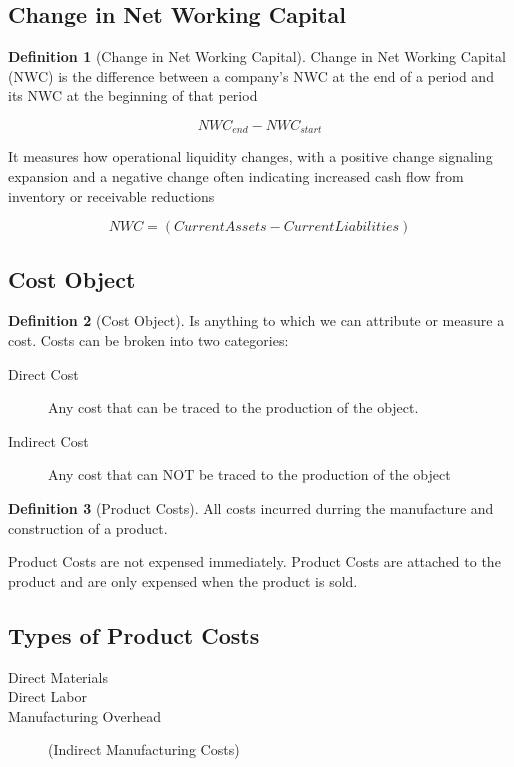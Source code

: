 \documentclass[12pt]{report}
\numberwithin{equation}{chapter}
\theoremstyle{definition}
\newtheorem{definition}{Definition}[chapter]
\theoremstyle{plain}
\theoremstyle{remark}
\begin{document}
\subsection{Change in Net Working Capital}
\begin{definition}[Change in Net Working Capital]
    Change in Net Working Capital (NWC) is the difference between a company's
    NWC at the end of a period and its NWC at the beginning of that period

    \[ NWC_{end} - NWC_{start} \]

    It measures how operational liquidity changes, with a positive change signaling
    expansion and a negative change often indicating increased cash flow from
    inventory or receivable reductions

    \[ NWC = (Current Assets - Current Liabilities) \]
\end{definition}

\subsection{Cost Object}
\begin{definition}[Cost Object]
    Is anything to which we can attribute or measure a cost. Costs can be broken into two categories:

    \begin{description}
        \item [Direct Cost] Any cost that can be traced to the production of the object.
        \item [Indirect Cost] Any cost that can NOT be traced to the production of the object
    \end{description}
\end{definition}

\begin{definition}[Product Costs]
    All costs incurred durring the manufacture and construction of a product.

    Product Costs are not expensed immediately. Product Costs are attached to the
    product and are only expensed when the product is sold.
\end{definition}

\subsection{Types of Product Costs}
\begin{description}
    \item [Direct Materials]
    \item [Direct Labor]
    \item [Manufacturing Overhead] (Indirect Manufacturing Costs)
\end{description}
\end{document}

